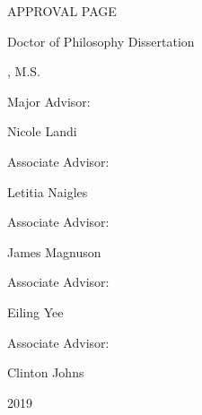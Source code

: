 \documentclass[../dissertation.tex]{subfiles}
\begin{document}
\begin{center}
\large
APPROVAL PAGE
\vspace{0.5cm}

\normalsize
Doctor of Philosophy Dissertation
\vspace{0.5cm}

\ptitle
\linebreak
\pauthor, M.S.
\vspace{1cm}
\end{center}


\noindent Major Advisor: \hrulefill
\linebreak
\centerline{Nicole Landi}
\vspace{0.5cm}

\noindent Associate Advisor: \hrulefill
\linebreak
\centerline{Letitia Naigles}
\vspace{0.5cm}

\noindent Associate Advisor: \hrulefill
\linebreak
\centerline{James Magnuson}
\vspace{0.5cm}

\noindent Associate Advisor: \hrulefill
\linebreak
\centerline{Eiling Yee}
\vspace{0.5cm}

\noindent Associate Advisor: \hrulefill
\linebreak
\centerline{Clinton Johns}
\vspace{0.5cm}

\vfill
\centerline{2019}
\end{document}

